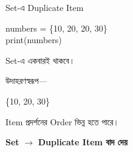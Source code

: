 
\begin{codeoutputbox}{Set-এ Duplicate Item}

\noindent
\begin{minipage}[t]{0.53\linewidth}
\codeheading

\begin{english}
\ttfamily
numbers = \{10, 20, 20, 30\}\\
print(numbers)
\end{english}

\end{minipage}
\hfill
\begin{minipage}[t]{0.43\linewidth}
\outputheading

Set-এ
\textenglish{}
একবারই থাকবে।

উদাহরণস্বরূপ—

\begin{center}
\textenglish{\ttfamily \{10, 20, 30\}}
\end{center}

Item প্রদর্শনের Order ভিন্ন হতে পারে।

\end{minipage}

\end{codeoutputbox}

\begin{rememberbox}

\begin{center}

\textbf{Set}
\(\longrightarrow\)
\textbf{Duplicate Item বাদ দেয়}

\end{center}

\end{rememberbox}



